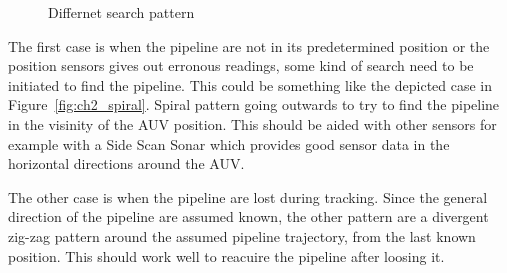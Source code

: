 		\begin{figure}[htbp]
			\centering
			 \quad
			\caption{Differnet search pattern}
			\label{fig:ch2_searchpattern}
		\end{figure}
		The first case is when the pipeline are not in its predetermined position or the position
		sensors gives out erronous readings, some kind of search need to be initiated to find the
		pipeline. This could be something like the depicted case in Figure~\ref{fig:ch2_spiral}.
		Spiral pattern going outwards to try to find the pipeline in the visinity of the AUV position.
		This should be aided with other sensors for example with a Side Scan Sonar which provides good
		sensor data in the horizontal directions around the AUV. 

		The other case is when the pipeline are lost during tracking. Since the general direction of
		the pipeline are assumed known, the other pattern are a divergent zig-zag pattern around the
		assumed pipeline trajectory, from the last known position. This should work well to reacuire
		the pipeline after loosing it.
		
	
